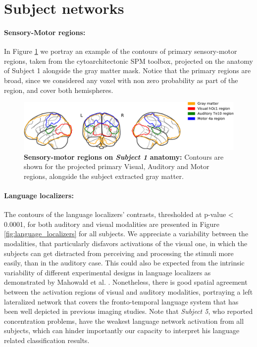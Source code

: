 \section{Subject networks}\label{sec:subject_networks}
%
\paragraph{Sensory-Motor regions:}
In Figure \ref{fig:sensory_example_img} we portray an example of the contours of primary sensory-motor regions, taken from the cytoarchitectonic SPM toolbox\citep{eickhoff2005new}, projected on the anatomy of Subject 1 alongside the gray matter mask.
Notice that the primary regions are broad, since we considered any voxel with non zero probability as part of the region, and cover both hemispheres.


\begin{figure}[hptb]
\centering
\includegraphics[width=1.0 \linewidth]{figures/part_II/sensory_example_img_with_legend.pdf}
\caption{\textbf{Sensory-motor regions on \emph{Subject 1} anatomy:}
Contours are shown for the projected primary Visual, Auditory and Motor regions, alongside the subject extracted gray matter.
}
\label{fig:sensory_example_img}
\end{figure}


\paragraph{Language localizers:}
The contours of the language localizers' contrasts, thresholded at p-value < 0.0001, for both auditory and visual modalities are presented in Figure \ref{fig:language_localizers} for all subjects.
We appreciate a variability between the modalities, that particularly disfavors activations of the visual one, in which the subjects can get distracted from perceiving and processing the stimuli more easily, than in the auditory case.
This could also be expected from the intrinsic variability of different experimental designs in language localizers as demonstrated by Mahowald et al. \citep{mahowald2016reliable}.
Nonetheless, there is good spatial agreement between the activation regions of visual and auditory modalities, portraying a left lateralized network that covers the fronto-temporal language system that has been well depicted in previous imaging studies\citep{mahowald2016reliable, fedorenko2010new, dehaene2010learning, binder1997human}.
Note that \emph{Subject 5}, who reported concentration problems, have the weakest language network activation from all subjects, which can hinder importantly our capacity to interpret his language related classification results.


